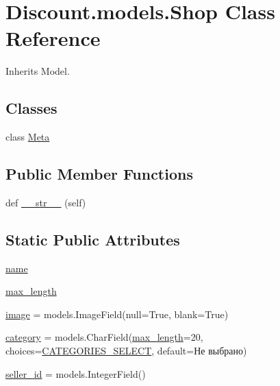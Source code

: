 \hypertarget{class_discount_1_1models_1_1_shop}{}\section{Discount.\+models.\+Shop Class Reference}
\label{class_discount_1_1models_1_1_shop}


Inherits Model.

\subsection*{Classes}
\begin{DoxyCompactItemize}
\item 
class \hyperlink{class_discount_1_1models_1_1_shop_1_1_meta}{Meta}
\end{DoxyCompactItemize}
\subsection*{Public Member Functions}
\begin{DoxyCompactItemize}
\item 
def \hyperlink{class_discount_1_1models_1_1_shop_a91048392df2885a996705fbe660ffd5f}{\+\_\+\+\_\+str\+\_\+\+\_\+} (self)
\end{DoxyCompactItemize}
\subsection*{Static Public Attributes}
\begin{DoxyCompactItemize}
\item 
\hyperlink{class_discount_1_1models_1_1_shop_aadc7ff6b61b895ca2fd14c2b88922c1b}{name}
\item 
\hyperlink{class_discount_1_1models_1_1_shop_a83a7981320af22f455105f091af196e1}{max\+\_\+length}
\item 
\hyperlink{class_discount_1_1models_1_1_shop_a8ab35884deffbc89b758f868bb6d23bf}{image} = models.\+Image\+Field(null=True, blank=True)
\item 
\hyperlink{class_discount_1_1models_1_1_shop_ab244c6e77136a6dd07e36102dd5ea8fb}{category} = models.\+Char\+Field(\hyperlink{class_discount_1_1models_1_1_shop_a83a7981320af22f455105f091af196e1}{max\+\_\+length}=20, choices=\hyperlink{namespace_discount_1_1models_a125399ca6dffacd93430a3418d3f39bb}{C\+A\+T\+E\+G\+O\+R\+I\+E\+S\+\_\+\+S\+E\+L\+E\+CT}, default=\textquotesingle{}Не выбрано\textquotesingle{})
\item 
\hyperlink{class_discount_1_1models_1_1_shop_ab1b38e3bb2536b544da13a3c734f49d7}{seller\+\_\+id} = models.\+Integer\+Field()
\end{DoxyCompactItemize}


